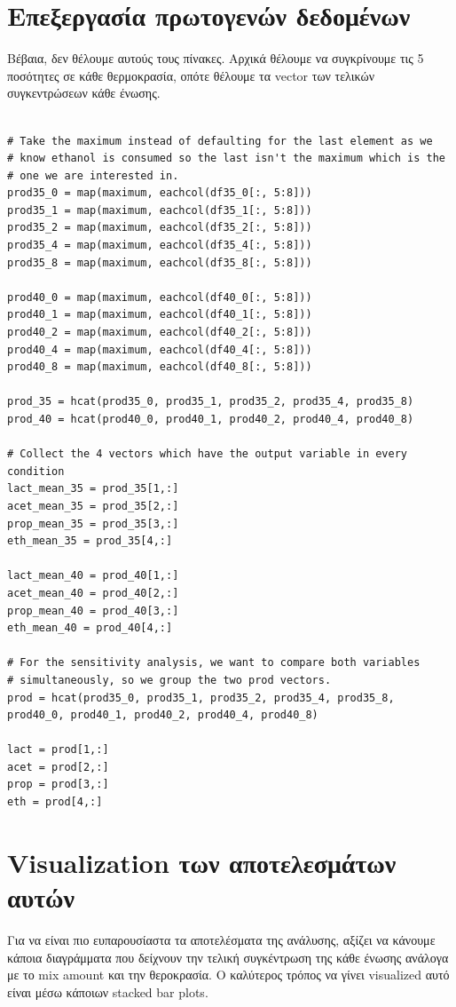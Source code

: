 \documentclass[11pt]{article}
\begin{document}
\section{Επεξεργασία πρωτογενών δεδομένων}
\label{sec:orgd7987b7}
Βέβαια, δεν θέλουμε αυτούς τους πίνακες. Αρχικά θέλουμε να συγκρίνουμε τις 5 ποσότητες σε κάθε θερμοκρασία, οπότε θέλουμε τα vector των τελικών συγκεντρώσεων κάθε ένωσης.

\begin{verbatim}

# Take the maximum instead of defaulting for the last element as we
# know ethanol is consumed so the last isn't the maximum which is the
# one we are interested in.
prod35_0 = map(maximum, eachcol(df35_0[:, 5:8]))
prod35_1 = map(maximum, eachcol(df35_1[:, 5:8]))
prod35_2 = map(maximum, eachcol(df35_2[:, 5:8]))
prod35_4 = map(maximum, eachcol(df35_4[:, 5:8]))
prod35_8 = map(maximum, eachcol(df35_8[:, 5:8]))

prod40_0 = map(maximum, eachcol(df40_0[:, 5:8]))
prod40_1 = map(maximum, eachcol(df40_1[:, 5:8]))
prod40_2 = map(maximum, eachcol(df40_2[:, 5:8]))
prod40_4 = map(maximum, eachcol(df40_4[:, 5:8]))
prod40_8 = map(maximum, eachcol(df40_8[:, 5:8]))

prod_35 = hcat(prod35_0, prod35_1, prod35_2, prod35_4, prod35_8)
prod_40 = hcat(prod40_0, prod40_1, prod40_2, prod40_4, prod40_8)

# Collect the 4 vectors which have the output variable in every condition
lact_mean_35 = prod_35[1,:]
acet_mean_35 = prod_35[2,:]
prop_mean_35 = prod_35[3,:]
eth_mean_35 = prod_35[4,:]

lact_mean_40 = prod_40[1,:]
acet_mean_40 = prod_40[2,:]
prop_mean_40 = prod_40[3,:]
eth_mean_40 = prod_40[4,:]

# For the sensitivity analysis, we want to compare both variables
# simultaneously, so we group the two prod vectors.
prod = hcat(prod35_0, prod35_1, prod35_2, prod35_4, prod35_8, prod40_0, prod40_1, prod40_2, prod40_4, prod40_8)

lact = prod[1,:]
acet = prod[2,:]
prop = prod[3,:]
eth = prod[4,:]
\end{verbatim}

\section{Visualization των αποτελεσμάτων αυτών}
\label{sec:org10d2234}
Για να είναι πιο ευπαρουσίαστα τα αποτελέσματα της ανάλυσης, αξίζει να κάνουμε κάποια διαγράμματα που δείχνουν την τελική συγκέντρωση της κάθε ένωσης ανάλογα με το mix amount και την θεροκρασία. Ο καλύτερος τρόπος να γίνει visualized αυτό είναι μέσω κάποιων stacked bar plots.
\end{document}
